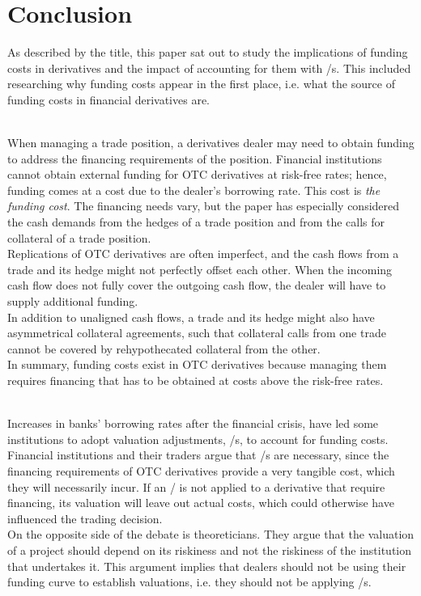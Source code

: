 \documentclass[main.tex]{subfiles}
\begin{document}
    \part{Conclusion}

    As described by the title, this paper sat out to study the implications
    of funding costs in derivatives and the impact of accounting for them with \FVA/s.
    This included researching why funding costs appear in the first place,
    i.e. what the source of funding costs in financial derivatives are.
    
    \textbf{\researchQuestionFundingCosts}\\
    When managing a trade position, a derivatives dealer may need to obtain funding 
    to address the financing requirements of the position.
    Financial institutions cannot obtain external funding for OTC derivatives at risk-free rates;
    hence, funding comes at a cost due to the dealer's borrowing rate.
    This cost is \textit{the funding cost}.
    The financing needs vary, but the paper has especially considered
    the cash demands from the hedges of a trade position
    and from the calls for collateral of a trade position.
    \\
    Replications of OTC derivatives are often imperfect,
    and the cash flows from a trade and its hedge might not perfectly offset each other.
    When the incoming cash flow does not fully cover the outgoing cash flow,
    the dealer will have to supply additional funding.
    \\
    In addition to unaligned cash flows, 
    a trade and its hedge might also have asymmetrical collateral agreements,
    such that collateral calls from one trade cannot be covered by rehypothecated collateral from the other.
    \\
    In summary, funding costs exist in OTC derivatives
    because managing them requires financing 
    that has to be obtained at costs above the risk-free rates.

    \textbf{\researchQuestionFvaDebate}\\
    Increases in banks' borrowing rates after the financial crisis,
    have led some institutions to adopt valuation adjustments, \FVA/s, to account for funding costs.
    Financial institutions and their traders argue that \FVA/s are necessary,
    since the financing requirements of OTC derivatives provide a very tangible cost,
    which they will necessarily incur.
    If an \FVA/ is not applied to a derivative that require financing,
    its valuation will leave out actual costs, 
    which could otherwise have influenced the trading decision.
    \\
    On the opposite side of the debate is theoreticians.
    They argue that the valuation of a project should depend on its riskiness
    and not the riskiness of the institution that undertakes it.
    This argument implies that dealers should not be using their funding curve to establish 
    valuations, i.e. they should not be applying \FVA/s.
\end{document}
